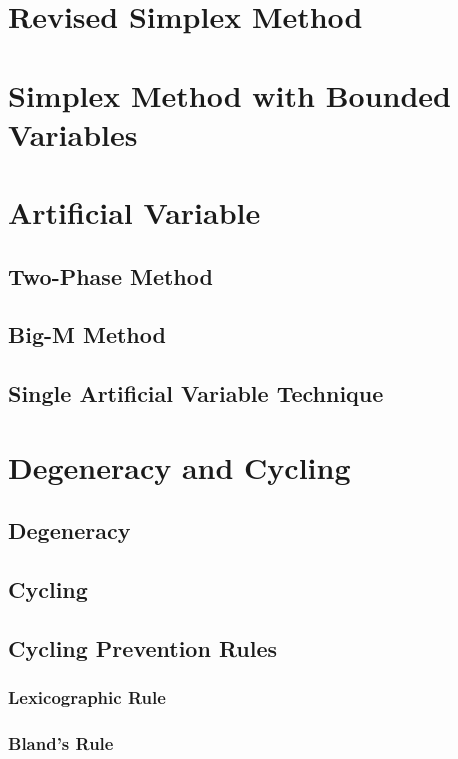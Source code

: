\documentclass[10pt]{book}
\begin{document}
			\section{Revised Simplex Method}

			\section{Simplex Method with Bounded Variables}

			\section{Artificial Variable}
				\subsection{Two-Phase Method}

				\subsection{Big-M Method}

				\subsection{Single Artificial Variable Technique}

			\section{Degeneracy and Cycling}
				\subsection{Degeneracy}

				\subsection{Cycling}

				\subsection{Cycling Prevention Rules}
					\subsubsection{Lexicographic Rule}

					\subsubsection{Bland's Rule}
\end{document}
